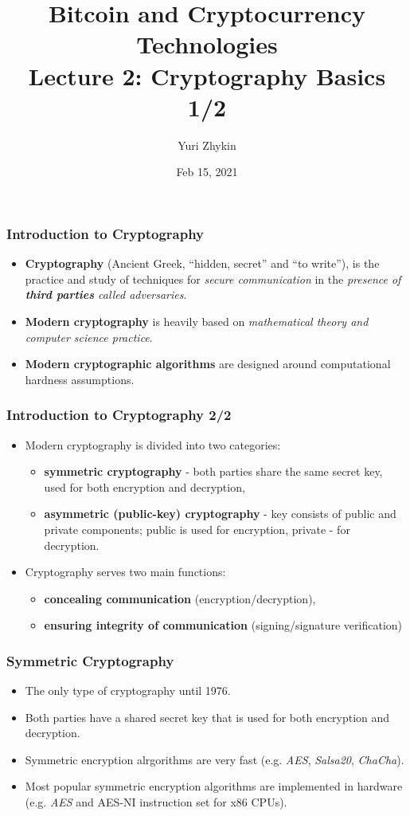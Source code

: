 \documentclass{beamer}
\title{
  Bitcoin and Cryptocurrency Technologies \\
  Lecture 2: Cryptography Basics 1/2
}
\author{Yuri Zhykin}
\date{Feb 15, 2021}
\begin{document}
\frame{\titlepage}

\begin{frame}
  \frametitle{Introduction to Cryptography}
  \begin{itemize}
  \item \textbf{Cryptography} (Ancient Greek, ``hidden, secret'' and ``to
    write''), is the practice and study of techniques for \textit{secure
      communication} in the \textit{presence of \textbf{third parties} called
      adversaries}.
  \item \textbf{Modern cryptography} is heavily based on \textit{mathematical
      theory and computer science practice}.
  \item \textbf{Modern cryptographic algorithms} are designed around
    computational hardness assumptions.
  \end{itemize}
\end{frame}

\begin{frame}
  \frametitle{Introduction to Cryptography 2/2}
  \begin{itemize}
  \item Modern cryptography is divided into two categories:
    \begin{itemize}
    \item \textbf{symmetric cryptography} - both parties share the same secret
      key, used for both encryption and decryption,
    \item \textbf{asymmetric (public-key) cryptography} - key consists of public
      and private components; public is used for encryption, private - for
      decryption.
    \end{itemize}
  \item Cryptography serves two main functions:
    \begin{itemize}
    \item \textbf{concealing communication} (encryption/decryption),
    \item \textbf{ensuring integrity of communication} (signing/signature
      verification)
    \end{itemize}
  \end{itemize}
\end{frame}

\begin{frame}
  \frametitle{Symmetric Cryptography}
  \begin{itemize}
  \item The only type of cryptography until 1976.
  \item Both parties have a shared secret key that is used for both encryption
    and decryption.
  \item Symmetric encryption alrgorithms are very fast (e.g. \textit{AES},
    \textit{Salsa20}, \textit{ChaCha}).
  \item Most popular symmetric encryption algorithms are implemented in hardware
    (e.g. \textit{AES} and AES-NI instruction set for x86 CPUs).
  \end{itemize}
\end{frame}
\end{document}
